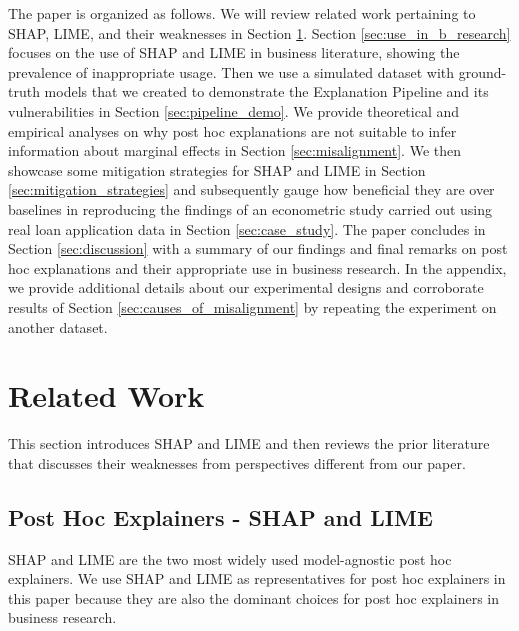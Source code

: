 \documentclass[12pt]{article}  %
\newcommand{\tw}[1]{\textcolor{red}{Tong: #1}}
\begin{document}
    The paper is organized as follows. We will review related work pertaining to SHAP, LIME, and their weaknesses in Section \ref{sec:related_work}. Section \ref{sec:use_in_b_research} focuses on the use of SHAP and LIME in business literature, showing the prevalence of inappropriate usage. Then we use a simulated dataset with ground-truth models that we created to demonstrate the Explanation Pipeline and its vulnerabilities in Section \ref{sec:pipeline_demo}.  We provide theoretical and empirical analyses on why post hoc explanations are not suitable to infer information about marginal effects in Section \ref{sec:misalignment}. 
    We then showcase some mitigation strategies for SHAP and LIME in Section \ref{sec:mitigation_strategies} and subsequently gauge how beneficial they are over baselines in reproducing the findings of an econometric study carried out using real loan application data in Section \ref{sec:case_study}. The paper concludes in Section \ref{sec:discussion} with a summary of our findings and final remarks on post hoc explanations and their appropriate use in business research. In the appendix, we provide additional details about our experimental designs and  corroborate results of Section \ref{sec:causes_of_misalignment} by repeating the experiment on another dataset.%
    
\section{Related Work}
    \label{sec:related_work}
    This section introduces SHAP and LIME and then reviews the prior literature that discusses their weaknesses from perspectives different from our paper. %

    \subsection{Post Hoc Explainers - SHAP and LIME}
     SHAP \citep{lundberg17shap} and LIME \citep{ribeiro16lime}  are the two most widely used model-agnostic post hoc explainers. %
        We use SHAP and LIME as representatives for post hoc explainers in this paper because they are also the dominant choices for post hoc explainers in business research.
\end{document}
